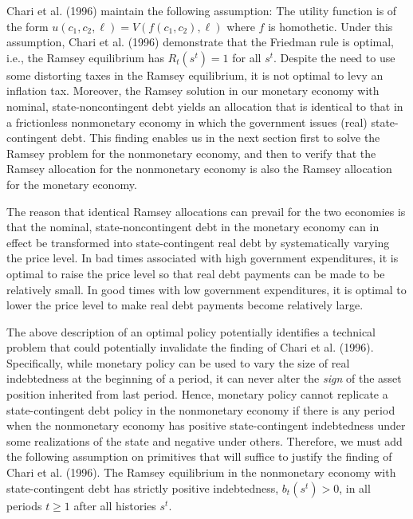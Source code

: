 Chari et al. (1996) maintain the following assumption:
\medskip
{}  The utility function is of the form
$u(c_1, c_2, \ell) = V( f(c_1, c_2), \ell )$
where $f$ is homothetic.
\medskip
\noindent
Under this assumption,  Chari et al. (1996) demonstrate
that the Friedman rule is optimal, i.e., the Ramsey equilibrium has
$R_t(s^t)=1$ for all $s^t$.
Despite the need to use some distorting taxes in the Ramsey equilibrium, it is
not optimal to levy an inflation tax. Moreover, the Ramsey solution
in our monetary economy with nominal, state-noncontingent debt yields an
allocation that is identical to that in a frictionless nonmonetary economy in
which the government issues (real) state-contingent debt. This finding enables us
in the next section first to  solve the Ramsey problem for the nonmonetary  economy, and then
to verify that the  Ramsey allocation for the nonmonetary economy  is also the Ramsey allocation for the monetary economy.

The reason that identical Ramsey allocations can prevail for the two economies is that the nominal, state-noncontingent debt in
the monetary economy can in effect be transformed into state-contingent real debt by
systematically varying the price level. In bad times associated  with high government
expenditures, it is optimal to raise the price level so that  real debt payments can be made to be relatively small.
In good times with low government expenditures, it is optimal to lower the price level to make  real
debt payments become  relatively large.

The above description of an optimal policy potentially identifies a technical  problem that could potentially  invalidate
the finding of Chari et al. (1996). Specifically, while monetary policy can be used
to vary the size of real indebtedness at the beginning of a period, it can never alter
 the {\it  sign \/} of the asset position  inherited from  last period. Hence,
monetary policy cannot replicate a state-contingent debt policy in the nonmonetary economy
if there is any period when the nonmonetary economy has positive state-contingent indebtedness
under some realizations of the state and negative under others. Therefore, we must add the
following  assumption on primitives that will suffice to justify  the finding of
Chari et al. (1996).
\medskip
{}  The Ramsey equilibrium in the nonmonetary economy with
state-contingent debt has strictly positive indebtedness, $b_{t}(s^{t})>0$, in all
periods $t\geq1$ after all histories $s^{t}$.
\medskip
\noindent




